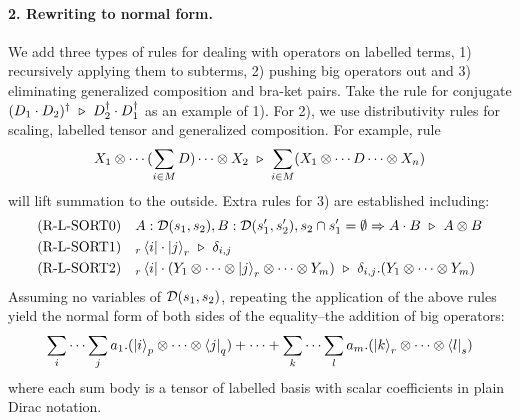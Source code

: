 \paragraph*{2. Rewriting to normal form.}
We add three types of rules for dealing with operators on labelled terms, 1) recursively applying them to subterms, 2) pushing big operators out and 3) eliminating generalized composition and bra-ket pairs.
Take the rule for conjugate $(D_1 \cdot D_2)^\dagger \ \triangleright\ D_2^\dagger \cdot D_1^\dagger$ as an example of 1).
For 2), we use distributivity rules for scaling, labelled tensor and generalized composition. For example, rule
\[
X_1 \otimes \cdots (\sum_{i \in M} D) \cdots \otimes X_2\ \triangleright\ \sum_{i \in M} (X_1 \otimes \cdots D \cdots \otimes X_n)
\]
will lift summation to the outside.
Extra rules for 3) are established including:
\begin{align*}
    & \textrm{(R-L-SORT0)}
    && A : \mathcal{D}(s_1, s_2), B : \mathcal{D}(s_1', s_2'), s_2 \cap s_1'=\emptyset \Rightarrow A \cdot B \ \triangleright\ A \otimes B \\
    & \textrm{(R-L-SORT1)}
    && {}_r\bra{i}\cdot\ket{j}_r \ \triangleright\ \delta_{i, j} \\
    & \textrm{(R-L-SORT2)}
    && {}_r\bra{i}\cdot(Y_1 \otimes \cdots \otimes \ket{j}_r \otimes \cdots \otimes Y_m) \ \triangleright\ \delta_{i, j}.(Y_1  \otimes \cdots \otimes Y_m)
\end{align*}
Assuming no variables of $\mathcal{D}(s_1, s_2)$, 
repeating the application of the above rules yield the normal form of both sides of the equality--the addition of big operators: 
\begin{equation}
  \label{eqn:Labelled normal}
  \sum_{i}\cdots\sum_{j} a_1 . (\ket{i}_{p} \otimes \cdots \otimes \bra{j}_{q})
  + \cdots +
  \sum_{k}\cdots\sum_{l} a_m . (\ket{k}_{r} \otimes \cdots \otimes \bra{l}_{s})
\end{equation}
where each sum body is a tensor of labelled basis with scalar coefficients in plain Dirac notation.

